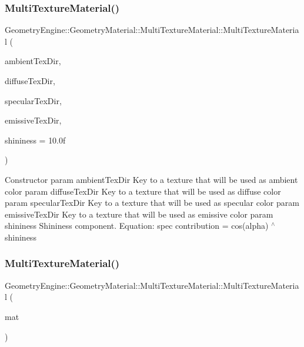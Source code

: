 \subsubsection{\texorpdfstring{MultiTextureMaterial()}{MultiTextureMaterial()}\hspace{0.1cm}{\footnotesize\ttfamily [1/2]}}
{\footnotesize\ttfamily Geometry\+Engine\+::\+Geometry\+Material\+::\+Multi\+Texture\+Material\+::\+Multi\+Texture\+Material (\begin{DoxyParamCaption}\item[{const std\+::string \&}]{ambient\+Tex\+Dir,  }\item[{const std\+::string \&}]{diffuse\+Tex\+Dir,  }\item[{const std\+::string \&}]{specular\+Tex\+Dir,  }\item[{const std\+::string \&}]{emissive\+Tex\+Dir,  }\item[{float}]{shininess = {\ttfamily 10.0f} }\end{DoxyParamCaption})}

Constructor param ambient\+Tex\+Dir Key to a texture that will be used as ambient color param diffuse\+Tex\+Dir Key to a texture that will be used as diffuse color param specular\+Tex\+Dir Key to a texture that will be used as specular color param emissive\+Tex\+Dir Key to a texture that will be used as emissive color param shininess Shininess component. Equation\+: spec contribution = cos(alpha) $^\wedge$ shininess \mbox{\label{class_geometry_engine_1_1_geometry_material_1_1_multi_texture_material_a78e60d57bd2dcbab07b96fd86426f453}} 
\subsubsection{\texorpdfstring{MultiTextureMaterial()}{MultiTextureMaterial()}\hspace{0.1cm}{\footnotesize\ttfamily [2/2]}}
{\footnotesize\ttfamily Geometry\+Engine\+::\+Geometry\+Material\+::\+Multi\+Texture\+Material\+::\+Multi\+Texture\+Material (\begin{DoxyParamCaption}\item[{const \mbox{\hyperlink{class_geometry_engine_1_1_geometry_material_1_1_multi_texture_material}{Multi\+Texture\+Material}} \&}]{mat }\end{DoxyParamCaption})}

